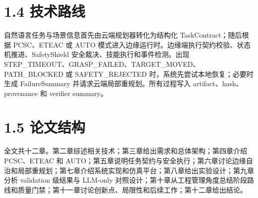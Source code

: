 \section{1.4 技术路线}

自然语言任务与场景信息首先由云端规划器转化为结构化 TaskContract；随后根据 PCSC、ETEAC 或 AUTO 模式进入边缘运行时。边缘端执行契约校验、状态机推进、SafetyShield 安全裁决、技能执行和事件检测。出现 STEP\_TIMEOUT、GRASP\_FAILED、TARGET\_MOVED、PATH\_BLOCKED 或 SAFETY\_REJECTED 时，系统先尝试本地恢复；必要时生成 FailureSummary 并请求云端局部重规划。所有过程写入 artifact、hash、provenance 和 verifier summary。\par

\section{1.5 论文结构}

全文共十二章。第二章综述相关技术；第三章给出需求和总体架构；第四章介绍 PCSC、ETEAC 和 AUTO；第五章说明任务契约与安全执行；第六章讨论边缘自治和局部重规划；第七章介绍系统实现和仿真平台；第八章给出实验设计；第九章分析 validation 级结果与 LLM-only 对照设计；第十章从工程管理角度总结阶段路线和质量门禁；第十一章讨论创新点、局限性和后续工作；第十二章给出结论。\par
